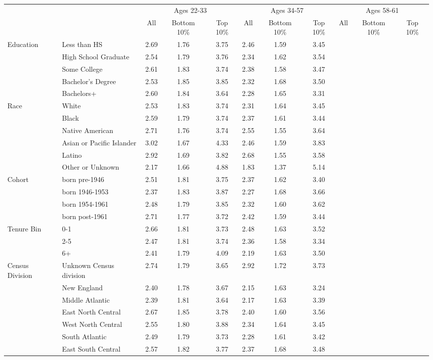 \begin{tabular}{llccc|ccc|ccc}
\hline\hline
 & & \multicolumn{3}{c|}{Ages 22-33} & \multicolumn{3}{c|}{Ages 34-57} & \multicolumn{3}{c}{Ages 58-61} \\
 & & All & Bottom 10\% & Top 10\% & All & Bottom 10\% & Top 10\% & All & Bottom 10\% & Top 10\% \\
\hline
Education&Less than HS&2.69&1.76&3.75&2.46&1.59&3.45&&&\\
&High School Graduate&2.54&1.79&3.76&2.34&1.62&3.54&&&\\
&Some College&2.61&1.83&3.74&2.38&1.58&3.47&&&\\
&Bachelor's Degree&2.53&1.85&3.85&2.32&1.68&3.50&&&\\
&Bachelors+&2.60&1.84&3.64&2.28&1.65&3.31&&&\\
Race&White&2.53&1.83&3.74&2.31&1.64&3.45&&&\\
&Black&2.59&1.79&3.74&2.37&1.61&3.44&&&\\
&Native American&2.71&1.76&3.74&2.55&1.55&3.64&&&\\
&Asian or Pacific Islander&3.02&1.67&4.33&2.46&1.59&3.83&&&\\
&Latino&2.92&1.69&3.82&2.68&1.55&3.58&&&\\
&Other or Unknown&2.17&1.66&4.88&1.83&1.37&5.14&&&\\
Cohort&born pre-1946&2.51&1.81&3.75&2.37&1.62&3.40&&&\\
&born 1946-1953&2.37&1.83&3.87&2.27&1.68&3.66&&&\\
&born 1954-1961&2.48&1.79&3.85&2.32&1.60&3.62&&&\\
&born post-1961&2.71&1.77&3.72&2.42&1.59&3.44&&&\\
Tenure Bin&0-1&2.66&1.81&3.73&2.48&1.63&3.52&&&\\
&2-5&2.47&1.81&3.74&2.36&1.58&3.34&&&\\
&6+&2.41&1.79&4.09&2.19&1.63&3.50&&&\\
Census Division&Unknown Census division&2.74&1.79&3.65&2.92&1.72&3.73&&&\\
&New England&2.40&1.78&3.67&2.15&1.63&3.24&&&\\
&Middle Atlantic&2.39&1.81&3.64&2.17&1.63&3.39&&&\\
&East North Central&2.67&1.85&3.78&2.40&1.60&3.56&&&\\
&West North Central&2.55&1.80&3.88&2.34&1.64&3.45&&&\\
&South Atlantic&2.49&1.79&3.73&2.28&1.61&3.42&&&\\
&East South Central&2.57&1.82&3.77&2.37&1.68&3.48&&&\\

\end{tabular}
